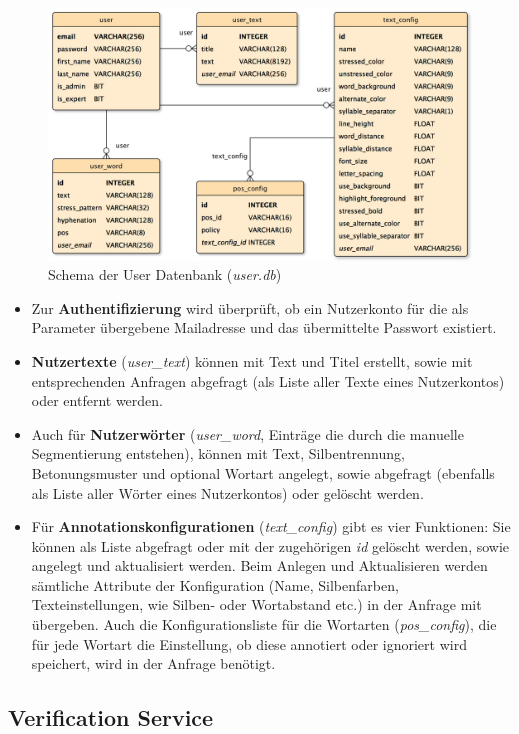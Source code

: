 \begin{figure}[h!]
	\centering
	\includegraphics[width=.8\linewidth]{figures/userservicedb}
	\caption{Schema der User Datenbank (\textit{user.db})}
	\label{fig:userdb}
\end{figure}

\begin{itemize}
	\item Zur \textbf{Authentifizierung} wird überprüft, ob ein Nutzerkonto für die als Parameter übergebene Mailadresse und das übermittelte Passwort existiert.
	
	\item \textbf{Nutzertexte} (\textit{user\_text}) können mit Text und Titel erstellt, sowie mit entsprechenden Anfragen abgefragt (als Liste aller Texte eines Nutzerkontos) oder entfernt werden.
	
	\item Auch für \textbf{Nutzerwörter} (\textit{user\_word}, Einträge die durch die manuelle Segmentierung entstehen), können mit Text, Silbentrennung, Betonungsmuster und optional Wortart angelegt, sowie abgefragt (ebenfalls als Liste aller Wörter eines Nutzerkontos) oder gelöscht werden.
	
	\item Für \textbf{Annotationskonfigurationen} (\textit{text\_config}) gibt es vier Funktionen: Sie können als Liste abgefragt oder mit der zugehörigen \textit{id} gelöscht werden, sowie angelegt und aktualisiert werden. Beim Anlegen und Aktualisieren werden sämtliche Attribute der Konfiguration (Name, Silbenfarben, Texteinstellungen, wie Silben- oder Wortabstand etc.) in der Anfrage mit übergeben. Auch die Konfigurationsliste für die Wortarten (\textit{pos\_config}), die für jede Wortart die Einstellung, ob diese annotiert oder ignoriert wird speichert, wird in der Anfrage benötigt.
\end{itemize}


\subsection{Verification Service}
\label{sec:verification-service}

